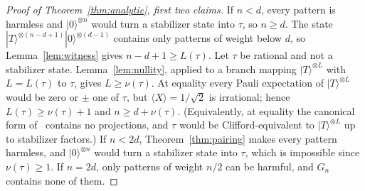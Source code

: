 \documentclass[aps,prl,reprint,twocolumn,amsmath,amssymb,floatfix,nofootinbib,superscriptaddress]{revtex4-2}
\begin{document}
\begin{proof}[Proof of Theorem~\ref{thm:analytic}, first two claims]
If $n<d$, every pattern is harmless and $|0\rangle^{\otimes n}$ would turn a stabilizer state into $\tau$, so $n\geq d$. The state $|T\rangle^{\otimes(n-d+1)}|0\rangle^{\otimes(d-1)}$ contains only patterns of weight below $d$, so Lemma~\ref{lem:witness} gives $n-d+1\geq L(\tau)$. Let $\tau$ be rational and not a stabilizer state. Lemma~\ref{lem:nullity}, applied to a branch mapping $|T\rangle^{\otimes L}$ with $L=L(\tau)$ to $\tau$, gives $L\geq\nu(\tau)$. At equality every Pauli expectation of $|T\rangle^{\otimes L}$ would be zero or $\pm$ one of $\tau$, but $\langle X\rangle=1/\sqrt2$ is irrational; hence $L(\tau)\geq\nu(\tau)+1$ and $n\geq d+\nu(\tau)$. (Equivalently, at equality the canonical form of~\cite[Theorem~5.3]{beverland} contains no projections, and $\tau$ would be Clifford-equivalent to $|T\rangle^{\otimes L}$ up to stabilizer factors.) If $n<2d$, Theorem~\ref{thm:pairing} makes every pattern harmless, and $|0\rangle^{\otimes n}$ would turn a stabilizer state into $\tau$, which is impossible since $\nu(\tau)\geq1$. If $n=2d$, only patterns of weight $n/2$ can be harmful, and $G_n$ contains none of them.
\end{proof}
\end{document}

